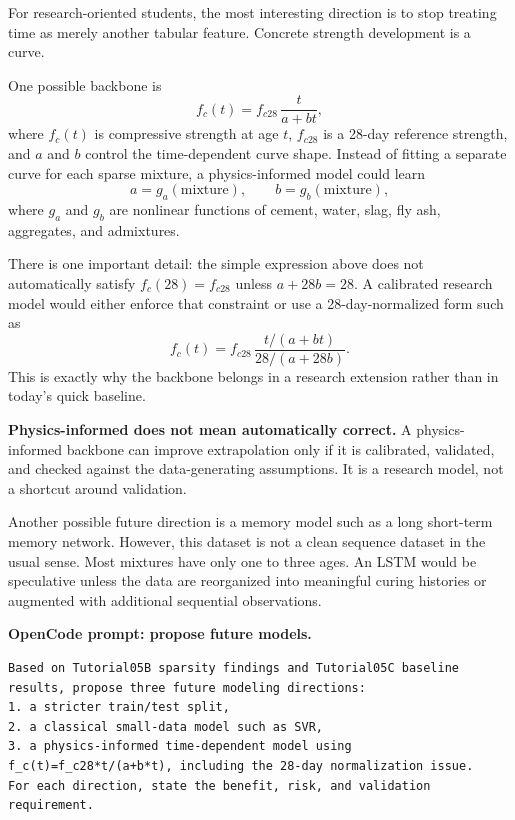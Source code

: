 \documentclass[11pt]{article}
\begin{document}
For research-oriented students, the most interesting direction is to stop treating time as merely another tabular feature.  Concrete strength development is a curve.

One possible backbone is
\[
  f_c(t) = f_{c28}\,\frac{t}{a + b t},
\]
where $f_c(t)$ is compressive strength at age $t$, $f_{c28}$ is a 28-day reference strength, and $a$ and $b$ control the time-dependent curve shape.  Instead of fitting a separate curve for each sparse mixture, a physics-informed model could learn
\[
  a = g_a(\text{mixture}), \qquad b = g_b(\text{mixture}),
\]
where $g_a$ and $g_b$ are nonlinear functions of cement, water, slag, fly ash, aggregates, and admixtures.

There is one important detail: the simple expression above does not automatically satisfy $f_c(28)=f_{c28}$ unless $a+28b=28$.  A calibrated research model would either enforce that constraint or use a 28-day-normalized form such as
\[
  f_c(t) = f_{c28}\,
  \frac{t/(a+b t)}{28/(a+28b)}.
\]
This is exactly why the backbone belongs in a research extension rather than in today's quick baseline.

\begin{alert-box}
\textbf{Physics-informed does not mean automatically correct.}  A physics-informed backbone can improve extrapolation only if it is calibrated, validated, and checked against the data-generating assumptions.  It is a research model, not a shortcut around validation.
\end{alert-box}

Another possible future direction is a memory model such as a long short-term memory network.  However, this dataset is not a clean sequence dataset in the usual sense.  Most mixtures have only one to three ages.  An LSTM would be speculative unless the data are reorganized into meaningful curing histories or augmented with additional sequential observations.

\begin{ex-box}
\textbf{OpenCode prompt: propose future models.}
\begin{lstlisting}[style=term]
Based on Tutorial05B sparsity findings and Tutorial05C baseline results, propose three future modeling directions:
1. a stricter train/test split,
2. a classical small-data model such as SVR,
3. a physics-informed time-dependent model using f_c(t)=f_c28*t/(a+b*t), including the 28-day normalization issue.
For each direction, state the benefit, risk, and validation requirement.
\end{lstlisting}
\end{ex-box}
\end{document}

